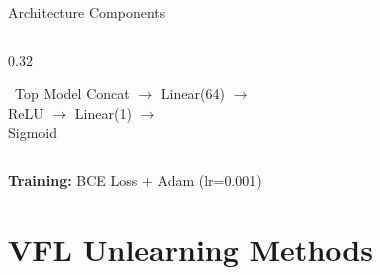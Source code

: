 \documentclass[aspectratio=169, 11pt]{beamer}
\begin{document}
\begin{frame}{Architecture Components}
\begin{columns}[T]
\begin{column}{0.32\textwidth}
\begin{block}{\faSitemap\ Top Model}
                \vspace{0.3em}
                \small
                Concat $\rightarrow$ Linear(64) $\rightarrow$\\
                ReLU $\rightarrow$ Linear(1) $\rightarrow$\\
                Sigmoid
            \end{block}
        \end{column}
    \end{columns}
    
    \vspace{0.5em}
    \begin{center}
        \colorbox{yellow!20}{\small \textbf{Training:} BCE Loss + Adam (lr=0.001)}
    \end{center}
\end{frame}

\section{VFL Unlearning Methods}
\end{document}
